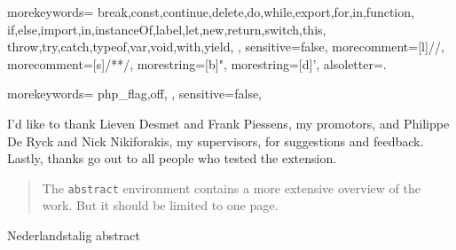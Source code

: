 \documentclass[master=csw]{kulemt}
\begin{document}
 {
    morekeywords={
        break,const,continue,delete,do,while,export,for,in,function,
        if,else,import,in,instanceOf,label,let,new,return,switch,this,
        throw,try,catch,typeof,var,void,with,yield,
        },
    sensitive=false,
    morecomment=[l]{//},
    morecomment=[s]{/*}{*/},
    morestring=[b]",
    morestring=[d]',
    alsoletter={.}
}

 {
    morekeywords={
        php_flag,off,
        },
    sensitive=false,
}


\begin{preface}
I'd like to thank Lieven Desmet and Frank Piessens, my promotors, and Philippe De Ryck and Nick Nikiforakis, my supervisors, for suggestions and feedback. Lastly, thanks go out to all people who tested the extension.
\end{preface}

\tableofcontents*

\begin{abstract}
The \texttt{abstract} environment contains a more extensive overview of
the work. But it should be limited to one page.
\end{abstract}

\begin{abstract*}
Nederlandstalig abstract
\end{abstract*}

\listoffiguresandtables

\printglossaries

\mainmatter







\backmatter

\end{document}
